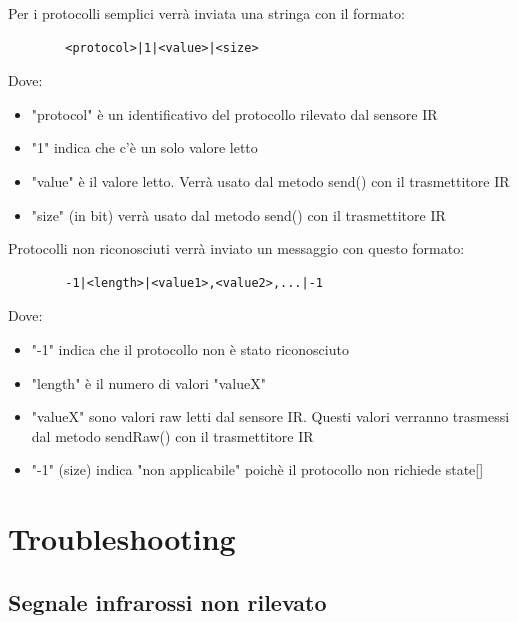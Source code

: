 \documentclass[a4paper,11pt]{article}
\begin{document}
    \begin{samepage}
      Per i protocolli semplici verrà inviata una stringa con il formato:

      \begin{verbatim}
        <protocol>|1|<value>|<size>
      \end{verbatim}

      Dove:
      \begin{itemize}
          \item "protocol" è un identificativo del protocollo rilevato dal sensore IR
          \item "1" indica che c'è un solo valore letto
          \item "value" è il valore letto. Verrà usato dal metodo send() con il trasmettitore IR
          \item "size" (in bit) verrà usato dal metodo send() con il trasmettitore IR
      \end{itemize}
    \end{samepage}

    \bigskip

    \begin{samepage}
      Protocolli non riconosciuti verrà inviato un messaggio con questo formato:

      \begin{verbatim}
        -1|<length>|<value1>,<value2>,...|-1
      \end{verbatim}

      Dove:
      \begin{itemize}
          \item "-1" indica che il protocollo non è stato riconosciuto
          \item "length" è il numero di valori "valueX"
          \item "valueX" sono valori raw letti dal sensore IR. Questi valori verranno trasmessi dal metodo sendRaw() con il trasmettitore IR
          \item "-1" (size) indica "non applicabile" poichè il protocollo non richiede state[]
      \end{itemize}
    \end{samepage}

\section{Troubleshooting}

    \subsection{Segnale infrarossi non rilevato}
\end{document}
